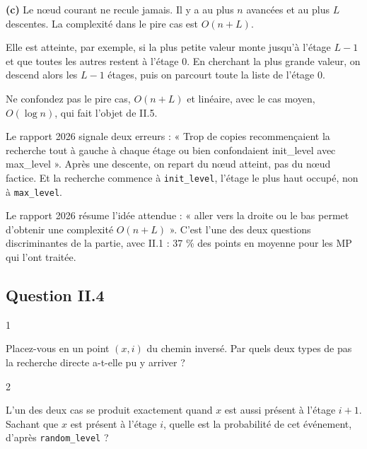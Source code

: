 \documentclass[11pt,a4paper]{article}
\begin{document}
\textbf{(c)} Le nœud courant ne recule jamais. Il y a au plus \(n\) avancées et au plus \(L\) descentes. La complexité dans le pire cas est \(\boxed{O(n+L)}\).

Elle est atteinte, par exemple, si la plus petite valeur monte jusqu'à l'étage \(L-1\) et que toutes les autres restent à l'étage 0. En cherchant la plus grande valeur, on descend alors les \(L-1\) étages, puis on parcourt toute la liste de l'étage 0.

\begin{piege}

Ne confondez pas le pire cas, \(O(n+L)\) et linéaire, avec le cas moyen, \(O(\log n)\), qui fait l'objet de II.5.

\end{piege}

\begin{piege}

Le rapport 2026 signale deux erreurs : « Trop de copies recommençaient la recherche tout à gauche à chaque étage ou bien confondaient init\_level avec max\_level ». Après une descente, on repart du nœud atteint, pas du nœud factice. Et la recherche commence à \texttt{init\_level}, l'étage le plus haut occupé, non à \texttt{max\_level}.

\end{piege}

\begin{jury}

Le rapport 2026 résume l'idée attendue : « aller vers la droite ou le bas permet d'obtenir une complexité \(O(n + L)\) ». C'est l'une des deux questions discriminantes de la partie, avec II.1 : 37 \% des points en moyenne pour les MP qui l'ont traitée.

\end{jury}

\hypertarget{question-ii.4}{%
\subsection{Question II.4}\label{question-ii.4}}

\begin{indication}{1}

Placez-vous en un point \((x,i)\) du chemin inversé. Par quels deux types de pas la recherche directe a-t-elle pu y arriver ?

\end{indication}

\begin{indication}{2}

L'un des deux cas se produit exactement quand \(x\) est aussi présent à l'étage \(i+1\). Sachant que \(x\) est présent à l'étage \(i\), quelle est la probabilité de cet événement, d'après \texttt{random\_level} ?

\end{indication}
\end{document}
